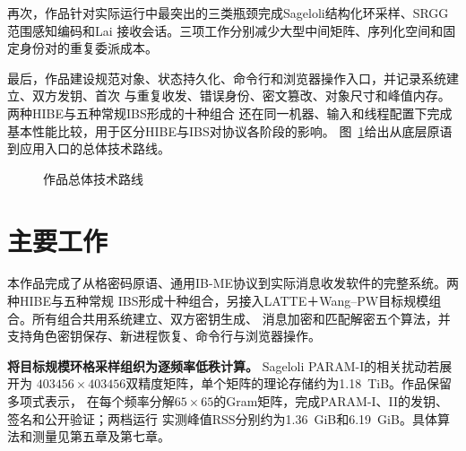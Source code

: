 再次，作品针对实际运行中最突出的三类瓶颈完成Sageloli结构化环采样、SRGG范围感知编码和Lai
接收会话。三项工作分别减少大型中间矩阵、序列化空间和固定身份对的重复委派成本。

最后，作品建设规范对象、状态持久化、命令行和浏览器操作入口，并记录系统建立、双方发钥、首次
与重复收发、错误身份、密文篡改、对象尺寸和峰值内存。两种HIBE与五种常规IBS形成的十种组合
还在同一机器、输入和线程配置下完成基本性能比较，用于区分HIBE与IBS对协议各阶段的影响。
图~\ref{fig:work-overview}给出从底层原语到应用入口的总体技术路线。

\begin{figure}[H]
\centering
{}
\caption{作品总体技术路线}
\label{fig:work-overview}
\end{figure}

\section{主要工作}

本作品完成了从格密码原语、通用IB-ME协议到实际消息收发软件的完整系统。两种HIBE与五种常规
IBS形成十种组合，另接入LATTE＋Wang--PW目标规模组合。所有组合共用系统建立、双方密钥生成、
消息加密和匹配解密五个算法，并支持角色密钥保存、新进程恢复、命令行与浏览器操作。

\textbf{将目标规模环格采样组织为逐频率低秩计算。} Sageloli PARAM-I的相关扰动若展开为
$403456\times403456$双精度矩阵，单个矩阵的理论存储约为1.18~TiB。作品保留多项式表示，
在每个频率分解$65\times65$的Gram矩阵，完成PARAM-I、II的发钥、签名和公开验证；两档运行
实测峰值RSS分别约为1.36~GiB和6.19~GiB。具体算法和测量见第五章及第七章。

